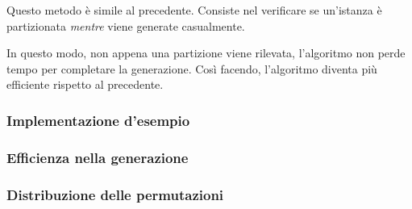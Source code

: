 \documentclass[../../main.tex]{subfiles}
\begin{document}
Questo metodo è simile al precedente.
Consiste nel verificare se un'istanza è partizionata \textit{mentre} viene generate casualmente.

In questo modo, non appena una partizione viene rilevata, l'algoritmo non perde tempo per completare la generazione.
Così facendo, l'algoritmo diventa più efficiente rispetto al precedente.

\subsubsection{Implementazione d'esempio}


\subsubsection{Efficienza nella generazione}

\subsubsection{Distribuzione delle permutazioni}
\end{document}
